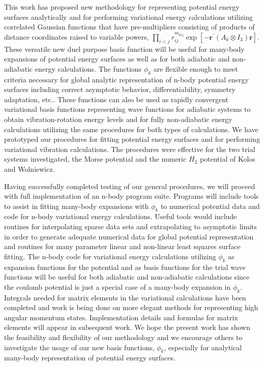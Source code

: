 \documentclass[12pt,thmsa]{article}
\begin{document}
This work has proposed new methodology for representing potential energy
surfaces analytically and for performing variational energy calculations
utilizing correlated Gaussian functions that have pre-multipliers consisting
of products of distance coordinates raised to variable powers, $%
\prod_{i<j}r_{ij}^{m_{kij}}\exp \left[ -\mathbf{r}^{\prime }(A_k\otimes I_3)%
\mathbf{r}\right] $. These versatile new duel purpose basis function will be
useful for many-body expansions of potential energy surfaces as well as for
both adiabatic and non-adiabatic energy calculations. The functions $\phi _k$
are flexible enough to meet criteria necessary for global analytic
representation of n-body potential energy surfaces including correct
asymptotic behavior, differentiability, symmetry adaptation, etc.. These
functions can also be used as rapidly convergent variational basis functions
representing wave functions for adiabatic systems to obtain
vibration-rotation energy levels and for fully non-adiabatic energy
calculations utilizing the same procedures for both types of calculations.
We have prototyped our procedures for fitting potential energy surfaces and
for performing variational vibration calculations. The procedures were
effective for the two trial systems investigated, the Morse potential and
the numeric $H_2$ potential of Kolos and Wolniewicz\cite{Kolos65}.

Having successfully completed testing of our general procedures, we will
proceed with full implementation of an n-body program suite. Programs will
include tools to assist in fitting many-body expansions with $\phi _k$ to
numerical potential data and code for n-body variational energy
calculations. Useful tools would include routines for interpolating sparse
data sets and extrapolating to asymptotic limits in order to generate
adequate numerical data for global potential representation and routines for
many parameter linear and non-linear least squares surface fitting. The
n-body code for variational energy calculations utilizing $\phi _k$ as
expansion functions for the potential and as basis functions for the trial
wave functions will be useful for both adiabatic and non-adiabatic
calculations since the coulomb potential is just a special case of a
many-body expansion in $\phi _k$. Integrals needed for matrix elements in
the variational calculations have been completed and work is being done on
more elegant methods for representing high angular momentum states.
Implementation details and formulas for matrix elements will appear in
subsequent work. We hope the present work has shown the feasibility and
flexibility of our methodology and we encourage others to investigate the
usage of our new basis functions, $\phi _k$, especially for analytical
many-body representation of potential energy surfaces.



\end{document}

